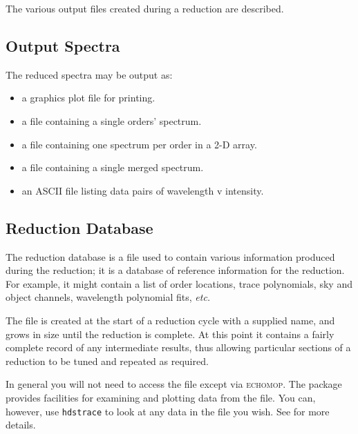 \documentclass[twoside,11pt,nolof]{starlink}
\newcommand{\mlabel}[1]{\xlabel{#1}\label{#1}}
\begin{document}
The various output files created during a reduction are described.

\subsection{\mlabel{output_spectra}Output Spectra}

The reduced spectra may be output as:

\begin{itemize}

\item a graphics plot file for printing.

\item a file containing a single orders' spectrum.

\item a file containing one spectrum per order in a 2-D array.

\item a file containing a single merged spectrum.

\item an ASCII file listing data pairs of wavelength v intensity.


\end{itemize}

\subsection{Reduction Database}

The reduction database is a file used to contain
various information produced during the reduction; it is a database of
reference information for the reduction.
For example, it might contain a list of order locations,
trace polynomials, sky and object channels, wavelength polynomial fits,
{\it etc.}

The file is created at the start of a reduction cycle with a supplied name,
and grows in size until the reduction is complete.
At this point it contains a fairly complete record of any intermediate
results, thus allowing particular sections of a reduction to be tuned
and repeated as required.

In general you will not need to access the file except via \textsc{echomop}.
The package provides facilities for examining and plotting data from the file.
You can, however, use \texttt{hdstrace} to look at any data in the file you wish.
See  for more details.


\end{document}
